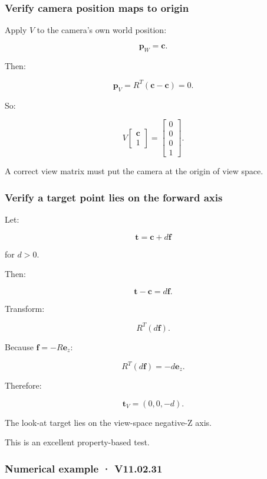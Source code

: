 \subsubsection{Verify camera position maps to origin}\label{verify-camera-position-maps-to-origin}

Apply \(V\) to the camera's own world position:

\[
 \mathbf p_W=\mathbf c.
\]

Then:

\[
 \mathbf p_V=R^T(\mathbf c-\mathbf c)=0.
\]

So:

\[
 \boxed{ V\begin{bmatrix}\mathbf c\\1\end{bmatrix} = \begin{bmatrix}0\\0\\0\\1\end{bmatrix} }.
\]

A correct view matrix must put the camera at the origin of view space.

\subsubsection{Verify a target point lies on the forward axis}\label{verify-a-target-point-lies-on-the-forward-axis}

Let:

\[
 \mathbf t=\mathbf c+d\mathbf f
\]

for \(d>0\).

Then:

\[
 \mathbf t-\mathbf c=d\mathbf f.
\]

Transform:

\[
 R^T(d\mathbf f).
\]

Because \(\mathbf f=-R\mathbf e_z\):

\[
 R^T(d\mathbf f) = -d\mathbf e_z.
\]

Therefore:

\[
 \boxed{ \mathbf t_V=(0,0,-d) }.
\]

The look-at target lies on the view-space negative-Z axis.

This is an excellent property-based test.

\subsubsection{Numerical example · V11.02.31}\label{numerical-example-v11.02.31}

